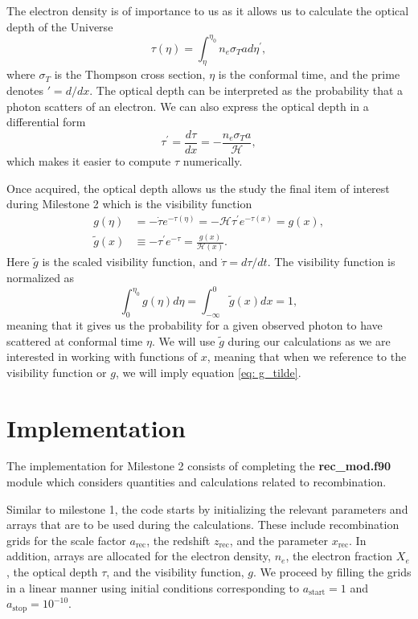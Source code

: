 \documentclass[a4paper, 10pt, reqno]{amsart}
\begin{document}
The electron density is of importance to us as it allows us to calculate the
optical depth of the Universe
\begin{equation}\label{eq: tau}
    \tau(\eta)=\int_{\eta}^{\eta_{0}} n_{e} \sigma_{T} a d \eta^{\prime},
\end{equation}
where $\sigma_T$ is the Thompson cross section, $\eta$ is the conformal time,
and the prime denotes $' = d/dx$. The optical depth can be interpreted as the
probability that a photon scatters of an electron. We can also express the
optical depth in a differential form
\begin{equation}\label{eq: tau'}
    \tau^{\prime}= \frac{d\tau}{dx} = -\frac{n_{e} \sigma_{T} a}{\mathcal{H}},
\end{equation}
which makes it easier to compute $\tau$ numerically.

Once acquired, the optical depth allows us the study the final item of
interest during Milestone 2 which is the visibility function
\begin{align}
g(\eta)&=-\dot{\tau} e^{-\tau(\eta)}=-\mathcal{H} \tau^{\prime}
e^{-\tau(x)}=g(x)\label{eq: g},\\
\tilde{g}(x) &\equiv-\tau^{\prime}
e^{-\tau}=\frac{g(x)}{\mathcal{H}(x)}.\label{eq: g_tilde}
\end{align}
Here $\tilde{g}$ is the scaled visibility function, and  $\dot{\tau} =
d\tau/dt$. The visibility function is normalized as
\begin{equation}
    \int_{0}^{\eta_{0}} g(\eta) d \eta=\int_{-\infty}^{0} \tilde{g}(x) d x=1,
\end{equation}
meaning that it gives us the probability for a given observed photon to have
scattered at conformal time $\eta$. We will use $\tilde{g}$ during our
calculations as we are interested in working with functions of $x$, meaning
that when we reference to the visibility function or $g$, we will imply
equation \eqref{eq: g_tilde}.

\section{Implementation}
The implementation for Milestone 2 consists of completing the
\textbf{rec\_mod.f90} module which considers quantities and calculations
related to recombination.

Similar to milestone 1, the code starts by initializing the relevant
parameters and arrays that are to be used during the calculations. These
include recombination grids for the scale factor $a_\mathrm{rec}$, the
redshift $z_\mathrm{rec}$, and the parameter $x_\mathrm{rec}$. In addition,
arrays are allocated for the electron density, $n_e$, the electron fraction
$X_e$, the optical depth $\tau$, and the visibility function, $g$. We proceed
by filling the grids in a linear manner using initial conditions corresponding
to $a_\mathrm{start} = 1$ and $a_\mathrm{stop} = 10^{-10}$.
\end{document}
